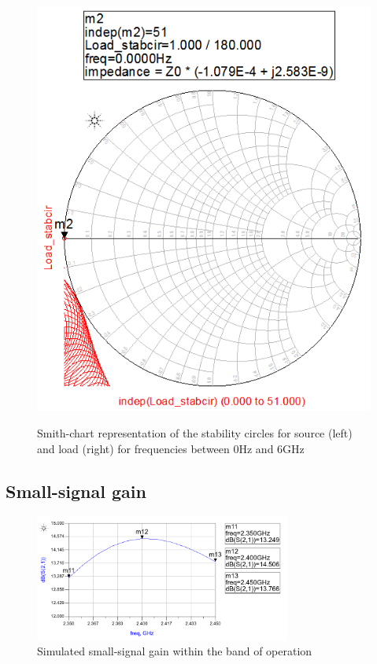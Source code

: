 \begin{figure}[H]
\begin{minipage}[b]{.45\textwidth}
	  \includegraphics[width=\linewidth]{img/Stabilization_load_circle}
	  \label{fig:Stabcircle_out}
  \end{minipage}
  \caption{Smith-chart representation of the stability circles for source (left) and load (right) for frequencies between 0Hz and 6GHz}
  \label{fig:Stabcircle}
  \end{figure}

  \subsection{Small-signal gain}

  \begin{figure}[H]
	  \centering
	  \includegraphics[width=0.75\textwidth]{img/Sim_S21}
	  \caption{Simulated small-signal gain within the band of operation}
	  \label{fig:Sim_S21}
  \end{figure}

